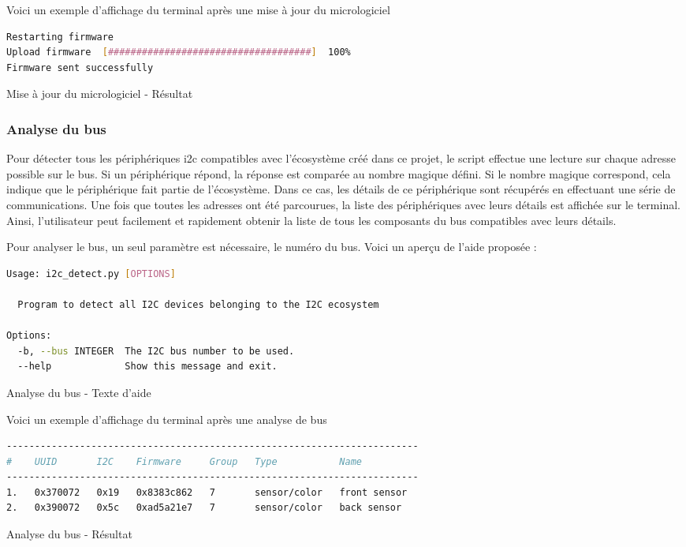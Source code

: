 Voici un exemple d'affichage du terminal après une mise à jour du micrologiciel

\begin{listing}[!h]
    \begin{lstlisting}[language=bash]
Restarting firmware
Upload firmware  [####################################]  100%
Firmware sent successfully
    \end{lstlisting}
    \caption{Mise à jour du micrologiciel - Résultat}
\end{listing}

\subsubsection{Analyse du bus}

Pour détecter tous les périphériques \gls{i2c} compatibles avec l'écosystème créé dans ce projet, le script effectue une lecture sur chaque adresse possible sur le bus.
Si un périphérique répond, la réponse est comparée au nombre magique défini.
Si le nombre magique correspond, cela indique que le périphérique fait partie de l'écosystème.
Dans ce cas, les détails de ce périphérique sont récupérés en effectuant une série de communications.
Une fois que toutes les adresses ont été parcourues, la liste des périphériques avec leurs détails est affichée sur le terminal.
Ainsi, l'utilisateur peut facilement et rapidement obtenir la liste de tous les composants du bus compatibles avec leurs détails.

Pour analyser le bus, un seul paramètre est nécessaire, le numéro du bus. Voici un aperçu de l'aide proposée :

\begin{listing}[!h]
    \begin{lstlisting}[language=bash]
Usage: i2c_detect.py [OPTIONS]

  Program to detect all I2C devices belonging to the I2C ecosystem

Options:
  -b, --bus INTEGER  The I2C bus number to be used.
  --help             Show this message and exit.
    \end{lstlisting}
    \caption{Analyse du bus - Texte d'aide}
\end{listing}

Voici un exemple d'affichage du terminal après une analyse de bus

\begin{listing}[!h]
    \begin{lstlisting}[language=bash]
-------------------------------------------------------------------------
#    UUID       I2C    Firmware     Group   Type           Name
-------------------------------------------------------------------------
1.   0x370072   0x19   0x8383c862   7       sensor/color   front sensor
2.   0x390072   0x5c   0xad5a21e7   7       sensor/color   back sensor
    \end{lstlisting}
    \caption{Analyse du bus - Résultat}
\end{listing}


